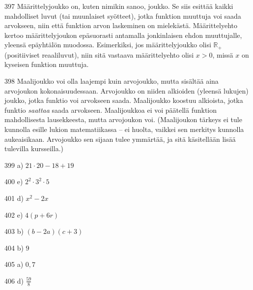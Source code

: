 \begin{Vastaus}{397}
Määrittelyjoukko on, kuten nimikin sanoo, joukko. Se siis esittää kaikki mahdolliset luvut (tai muunlaiset syötteet), jotka funktion muuttuja voi saada arvokseen, niin että funktion arvon laskeminen on mielekästä. Määrittelyehto kertoo määrittelyjoukon epäsuorasti antamalla jonkinlaisen ehdon muuttujalle, yleensä epäyhtälön muodossa. Esimerkiksi, jos määrittelyjoukko olisi $\mathbb{R}_+$ (positiiviset reaaliluvut), niin sitä vastaava määrittelyehto olisi $x>0$, missä $x$ on kyseisen funktion muuttuja.
\end{Vastaus}
\begin{Vastaus}{398}
Maalijoukko voi olla laajempi kuin arvojoukko, mutta sisältää aina arvojoukon kokonaisuudessaan. Arvojoukko on niiden alkioiden (yleensä lukujen) joukko, jotka funktio voi arvokseen saada. Maalijoukko koostuu alkioista, jotka funktio \textit{saattaa} saada arvokseen. Maalijoukkoa ei voi päätellä funktion mahdollisesta lausekkeesta, mutta arvojoukon voi. (Maalijoukon tärkeys ei tule kunnolla esille lukion matematiikassa -- ei huolta, vaikkei sen merkitys kunnolla aukeaisikaan. Arvojoukko sen sijaan tulee ymmärtää, ja sitä käsitellään lisää tulevilla kursseilla.)
	
\end{Vastaus}
\begin{Vastaus}{399}
	 a) $21\cdot 20-18+19$
	
\end{Vastaus}
\begin{Vastaus}{400}
	 e) $2^2\cdot3^2\cdot5$
	
\end{Vastaus}
\begin{Vastaus}{401}
	d) $x^2-2x$
    
\end{Vastaus}
\begin{Vastaus}{402}
	e) $4(p+6r)$
    
\end{Vastaus}
\begin{Vastaus}{403}
	b) $(b-2a)(c+3)$
    
\end{Vastaus}
\begin{Vastaus}{404}
	 b) $9$
    
\end{Vastaus}
\begin{Vastaus}{405}
	 a) $0,7$
    
\end{Vastaus}
\begin{Vastaus}{406}
	 d) $\frac{59}{8}$
    
\end{Vastaus}
